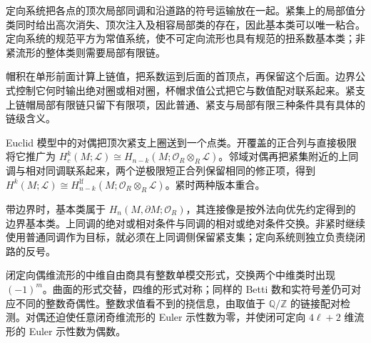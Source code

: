\begin{chaptersummary}
	定向系统把各点的顶次局部同调和沿道路的符号运输放在一起。紧集上的局部值分类同时给出高次消失、顶次注入及相容局部类的存在，因此基本类可以唯一粘合。定向系统的规范平方为常值系统，使不可定向流形也具有规范的扭系数基本类；非紧流形的整体类则需要局部有限链。

	\ProseParagraphBreak

	帽积在单形前面计算上链值，把系数运到后面的首顶点，再保留这个后面。边界公式控制它何时输出绝对圈或相对圈，杯帽求值公式把它与数值配对联系起来。紧支上链帽局部有限链只留下有限项，因此普通、紧支与局部有限三种条件具有具体的链级含义。

	\ProseParagraphBreak

	Euclid 模型中的对偶把顶次紧支上圈送到一个点类。开覆盖的正合列与直接极限将它推广为 \(H_c^k(M;\mathcal L)\cong H_{n-k}(M;\mathcal O_R\otimes_R\mathcal L)\)。邻域对偶再把紧集附近的上同调与相对同调联系起来，两个逆极限短正合列保留相同的修正项，得到 \(H^k(M;\mathcal L)\cong H_{n-k}^{\mathrm{lf}}(M;\mathcal O_R\otimes_R\mathcal L)\)。紧时两种版本重合。

	\ProseParagraphBreak

	带边界时，基本类属于 \(H_n(M,\partial M;\mathcal O_R)\)，其连接像是按外法向优先约定得到的边界基本类。上同调的绝对或相对条件与同调的相对或绝对条件交换。非紧时继续使用普通同调作为目标，就必须在上同调侧保留紧支集；定向系统则独立负责绕闭路的反号。

	\ProseParagraphBreak

	闭定向偶维流形的中维自由商具有整数单模交形式，交换两个中维类时出现 \((-1)^m\)。曲面的形式交替，四维的形式对称；同样的 Betti 数和实符号差仍可对应不同的整数奇偶性。整数求值看不到的挠信息，由取值于 \(\mathbb Q/\mathbb Z\) 的链接配对检测。对偶还迫使任意闭奇维流形的 Euler 示性数为零，并使闭可定向 \(4\ell+2\) 维流形的 Euler 示性数为偶数。
\end{chaptersummary}

\BookExercises

